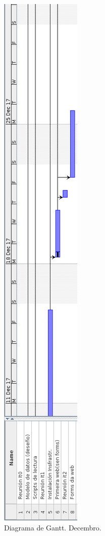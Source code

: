 \begin{figure}[H]
	\centering
	\includegraphics[scale=0.45,keepaspectratio=true]{./images/gantt/g2.png}
	\caption{Diagrama de Gantt. Decembro.}
\end{figure}

